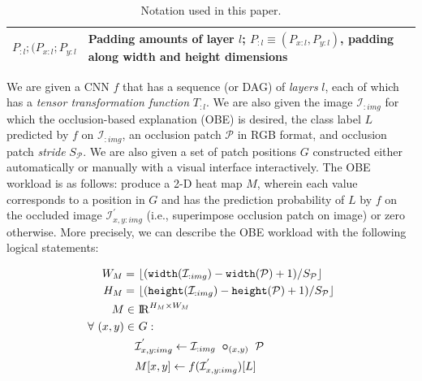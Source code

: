 \begin{table}[t]
{\begin{tabular}{p{2cm}p{7.5cm}}
    \midrule
    $P_{:l}; (P_{x:l}; P_{y:l}$ & Padding amounts of layer $l$; $P_{:l} \equiv (P_{x:l}, P_{y:l})$, padding along width and height dimensions\\
    \bottomrule
  \end{tabular}}
    \caption{Notation used in this paper.}
\label{table:preliminaries_symbols}
\vspace{-6mm}
\end{table}

We are given a CNN $f$ that has a sequence (or DAG) of \textit{layers} $l$, each of which has a \textit{tensor transformation function} $T_{:l}$. We are also given the image $\mathcal{I}_{:img}$ for which the occlusion-based explanation (OBE) is desired, the class label $L$ predicted by $f$ on $\mathcal{I}_{:img}$, an occlusion patch $\mathcal{P}$ in RGB format, and occlusion patch \textit{stride} $S_{\mathcal{P}}$. We are also given a set of patch positions $G$ constructed either automatically or manually with a visual interface interactively. The OBE workload is as follows: produce a 2-D heat map $M$, wherein each value corresponds to a position in $G$ and has the prediction probability of $L$ by $f$ on the occluded image $\mathcal{I}^{'}_{x,y:img}$ (i.e., superimpose occlusion patch on image) or zero otherwise.
More precisely, we can describe the OBE workload with the following logical statements:

\vspace{-2mm}
\begin{align}
\label{eqn:mheight}
W_M =&~ \lfloor(\texttt{width}(\mathcal{I}_{:img}) - \texttt{width}(\mathcal{P}) + 1)/S_\mathcal{P}\rfloor\\
\label{eqn:mwidth}
H_M =&~ \lfloor(\texttt{height}(\mathcal{I}_{:img}) - \texttt{height}(\mathcal{P}) + 1)/S_\mathcal{P}\rfloor\\
M \in&~ \mathcal{\rm I\!R}^{H_M \times W_M}\\
\forall~ (x,y) \in&~ G:\\
\label{eqn:patchimpose}
& \mathcal{I}^{'}_{x,y:img} \leftarrow \mathcal{I}_{:img} ~ \bm\circ_{(x,y)} ~ \mathcal{P} \\
\label{eqn:outputval}
& M[x,y] \leftarrow f(\mathcal{I}^{'}_{x,y:img})[L]
\end{align}

